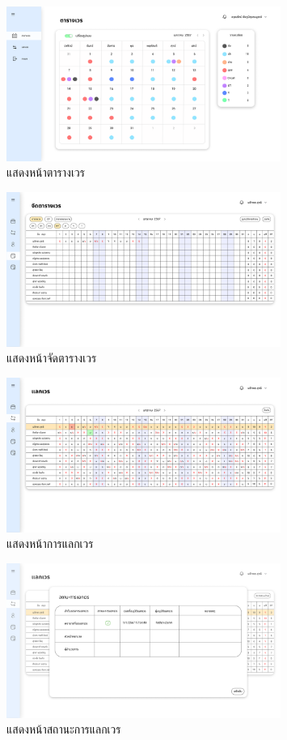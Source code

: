 \begin{figure}
    \centering
    \includegraphics[width=0.8\textwidth]{3 ui.png}
    \caption{แสดงหน้าตารางเวร}
\end{figure}

\begin{figure}
    \centering
    \includegraphics[width=0.8\textwidth]{4ui.png}
    \caption{แสดงหน้าจัดตารางเวร}
\end{figure}

\begin{figure}
    \centering
    \includegraphics[width=0.8\textwidth]{5ui.png}
    \caption{แสดงหน้าการแลกเวร}
\end{figure}

\begin{figure}
    \centering
    \includegraphics[width=0.8\textwidth]{6ui.png}
    \caption{แสดงหน้าสถานะการแลกเวร}
\end{figure}


